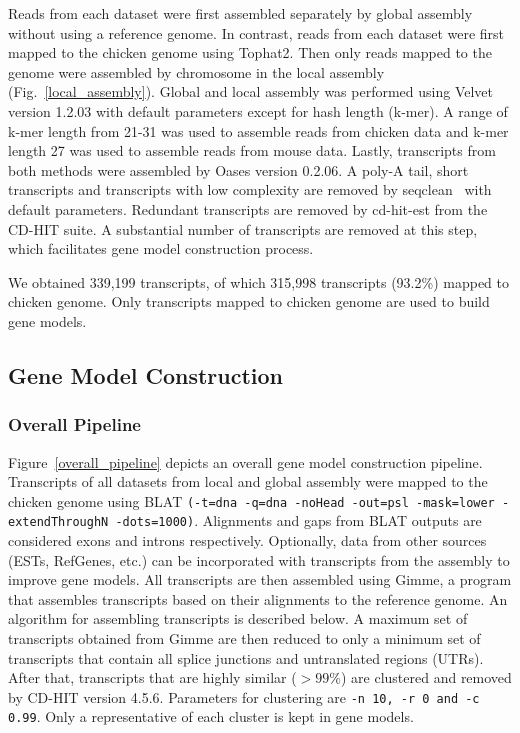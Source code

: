 \documentclass[10pt]{article}
\begin{document}
Reads from each dataset were first assembled separately by global assembly
without using a reference genome.  In contrast, reads from each dataset were
first mapped to the chicken genome using Tophat2.  Then only reads mapped to
the genome were assembled by chromosome in the local assembly
(Fig.~\ref{local_assembly}).  Global and local assembly was performed using
Velvet version 1.2.03\cite{Zerbino:2008vu} with default parameters except for
hash length (k-mer).  A range of k-mer length from 21-31 was used to assemble
reads from chicken data and k-mer length 27 was used to assemble reads from
mouse data.  Lastly, transcripts from both methods were assembled by Oases
version 0.2.06\cite{Schulz:2012je}.  A poly-A tail, short transcripts and
transcripts with low complexity are removed by seqclean~\cite{seqclean} with
default parameters.  Redundant transcripts are removed by cd-hit-est from the
CD-HIT suite\cite{Li:2006hr}.  A substantial number of transcripts are removed
at this step, which facilitates gene model construction process.

We obtained 339,199 transcripts, of which 315,998 transcripts (93.2\%) mapped
to chicken genome.  Only transcripts mapped to chicken genome are used to build
gene models.

\subsection*{Gene Model Construction}

\subsubsection*{Overall Pipeline}

Figure~\ref{overall_pipeline} depicts an overall gene model construction
pipeline.  Transcripts of all datasets from local and global assembly were
mapped to the chicken genome using BLAT\cite{Kent:2002tv} \texttt{(-t=dna -q=dna
-noHead -out=psl -mask=lower -extendThroughN -dots=1000)}.  Alignments and gaps
from BLAT outputs are considered exons and introns respectively.  Optionally,
data from other sources (ESTs, RefGenes, etc.) can be incorporated with
transcripts from the assembly to improve gene models.  All transcripts are then
assembled using Gimme, a program that assembles transcripts based on their
alignments to the reference genome.  An algorithm for assembling transcripts is
described below.  A maximum set of transcripts obtained from Gimme are then
reduced to only a minimum set of transcripts that contain all splice junctions
and untranslated regions (UTRs).  After that, transcripts that are highly
similar ($>99\%$) are clustered and removed by CD-HIT version
4.5.6\cite{Li:2006hr}.  Parameters for clustering are \texttt{-n 10, -r 0 and -c
0.99}.  Only a representative of each cluster is kept in gene models.
\end{document}
